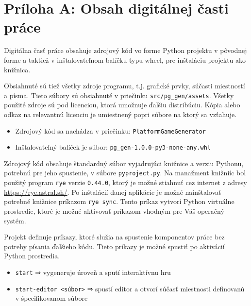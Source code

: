 \setcounter{page}{1}
\renewcommand{\thepage}{A.\arabic{page}}

\section*{Príloha A: Obsah digitálnej časti práce}

Digitálna časť práce obsahuje zdrojový kód vo forme Python projektu v pôvodnej forme a taktiež v inštalovateľnom balíčku typu wheel, pre inštaláciu projektu ako knižnica.

Obsiahnuté sú tiež všetky zdroje programu, t.j. grafické prvky, súčasti miestností a písma. Tieto súbory sú obsiahnuté v priečinku \texttt{src/pg\_gen/assets}. Všetky použité zdroje sú pod licenciou, ktorá umožnuje ďalšiu distribúciu. Kópia alebo odkaz na relevantnú licenciu je umiestnený popri súbore na ktorý sa vzťahuje. 

\begin{itemize}
    \item Zdrojový kód sa nachádza v priečinku: \texttt{PlatformGameGenerator} 
    \item Inštalovateľný balíček je súbor: \texttt{pg\_gen-1.0.0-py3-none-any.whl}
\end{itemize}

Zdrojový kód obsahuje štandardný súbor vyjadrujúci knižnice a verziu Pythonu, potrebnú pre jeho spustenie, v súbore \texttt{pyproject.py}. Na manažment knižniíc bol použitý program \texttt{rye} verzie \texttt{0.44.0}, ktorý je možné stiahnuť cez internet z adresy \url{https://rye.astral.sh/}. Po inštalácií danej aplikácie je možné nainštalovať potrebné knižnice príkazom \texttt{rye sync}. Tento príkaz vytvorí Python virtuálne prostredie, ktoré je možné aktivovať príkazom vhodným pre Váš operačný systém.

Projekt definuje príkazy, ktoré služia na spustenie komponentov práce bez potreby písania ďalšieho kódu. Tieto príkazy je možné spustiť po aktivácií Python prostredia.

\begin{itemize}
    \item \texttt{start} ⇒ vygeneruje úroveň a sputí interaktívnu hru
    \item \texttt{start-editor <súbor>} ⇒ spustí editor a otvorí súčasť miestnosti definovanú v špecifikovanom súbore
\end{itemize}

\newpage
\setcounter{page}{1}
\renewcommand{\thepage}{B.\arabic{page}}

